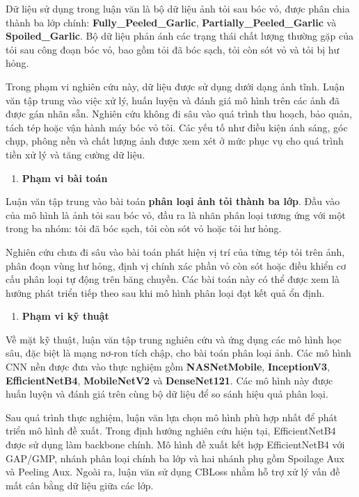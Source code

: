 \documentclass[
]{article}
\begin{document}
Dữ liệu sử dụng trong luận văn là bộ dữ liệu ảnh tỏi sau bóc vỏ, được
phân chia thành ba lớp chính: \textbf{Fully\_Peeled\_Garlic},
\textbf{Partially\_Peeled\_Garlic} và \textbf{Spoiled\_Garlic}. Bộ dữ
liệu phản ánh các trạng thái chất lượng thường gặp của tỏi sau công đoạn
bóc vỏ, bao gồm tỏi đã bóc sạch, tỏi còn sót vỏ và tỏi bị hư hỏng.

Trong phạm vi nghiên cứu này, dữ liệu được sử dụng dưới dạng ảnh tĩnh.
Luận văn tập trung vào việc xử lý, huấn luyện và đánh giá mô hình trên
các ảnh đã được gán nhãn sẵn. Nghiên cứu không đi sâu vào quá trình thu
hoạch, bảo quản, tách tép hoặc vận hành máy bóc vỏ tỏi. Các yếu tố như
điều kiện ánh sáng, góc chụp, phông nền và chất lượng ảnh được xem xét ở
mức phục vụ cho quá trình tiền xử lý và tăng cường dữ liệu.

\begin{enumerate}
\def\labelenumi{\alph{enumi}.}
\setcounter{enumi}{1}
\item
  \textbf{Phạm vi bài toán}
\end{enumerate}

Luận văn tập trung vào bài toán \textbf{phân loại ảnh tỏi thành ba lớp}.
Đầu vào của mô hình là ảnh tỏi sau bóc vỏ, đầu ra là nhãn phân loại
tương ứng với một trong ba nhóm: tỏi đã bóc sạch, tỏi còn sót vỏ hoặc
tỏi hư hỏng.

Nghiên cứu chưa đi sâu vào bài toán phát hiện vị trí của từng tép tỏi
trên ảnh, phân đoạn vùng hư hỏng, định vị chính xác phần vỏ còn sót hoặc
điều khiển cơ cấu phân loại tự động trên băng chuyền. Các bài toán này
có thể được xem là hướng phát triển tiếp theo sau khi mô hình phân loại
đạt kết quả ổn định.

\begin{enumerate}
\def\labelenumi{\alph{enumi}.}
\setcounter{enumi}{2}
\item
  \textbf{Phạm vi kỹ thuật}
\end{enumerate}

Về mặt kỹ thuật, luận văn tập trung nghiên cứu và ứng dụng các mô hình
học sâu, đặc biệt là mạng nơ-ron tích chập, cho bài toán phân loại ảnh.
Các mô hình CNN nền được đưa vào thực nghiệm gồm \textbf{NASNetMobile},
\textbf{InceptionV3}, \textbf{EfficientNetB4}, \textbf{MobileNetV2} và
\textbf{DenseNet121}. Các mô hình này được huấn luyện và đánh giá trên
cùng bộ dữ liệu để so sánh hiệu quả phân loại.

Sau quá trình thực nghiệm, luận văn lựa chọn mô hình phù hợp nhất để
phát triển mô hình đề xuất. Trong định hướng nghiên cứu hiện tại,
EfficientNetB4 được sử dụng làm backbone chính. Mô hình đề xuất kết hợp
EfficientNetB4 với GAP/GMP, nhánh phân loại chính ba lớp và hai nhánh
phụ gồm Spoilage Aux và Peeling Aux. Ngoài ra, luận văn sử dụng CBLoss
nhằm hỗ trợ xử lý vấn đề mất cân bằng dữ liệu giữa các lớp.
\end{document}
